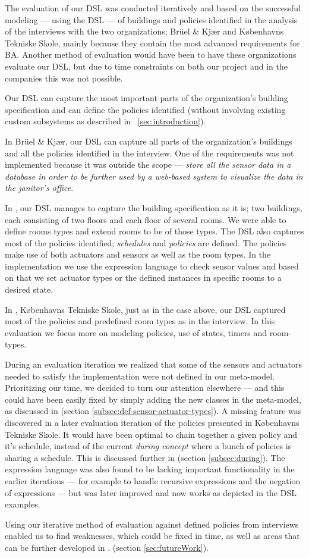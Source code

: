 The evaluation of our DSL was conducted iteratively and based on the successful modeling --- using the DSL --- of buildings and policies identified in the analysis of the interviews with the two organizations; Br\"{u}el \& Kj\ae r and K\o benhavns Tekniske Skole, mainly because they contain the most advanced requirements for BA. Another method of evaluation would have been to have these organizations evaluate our DSL, but due to time constraints on both our project and in the companies this was not possible. 

Our DSL can capture the most important parts of the organization's building specification and can define the policies identified (without involving existing custom subsystems as described in ~\ref{sec:introduction}). 

In Br\"{u}el \& Kj\ae r, our DSL can capture all parts of the organization's buildings and all the policies identified in the interview. One of the requirements was not implemented because it was outside the scope --- \textit{store all the sensor data in a database in order to be further used by a web-based system to visualize the data in the janitor's office}.

In , our DSL manages to capture the building specification as it is; two buildings, each consisting of two floors and each floor of several rooms. We were able to define rooms types and extend rooms to be of those types. The DSL also captures most of the policies identified; \textit{schedules} and \textit{policies} are defined. The policies make use of both actuators and sensors as well as the room types. In the implementation we use the expression language to check sensor values and based on that we set actuator types or the defined instances in specific rooms to a desired state.

In , K\o benhavns Tekniske Skole, just as in the case above, our DSL captured most of the policies and predefined room types as in the interview. In this evaluation we focus more on modeling policies, use of states, timers and room-types.

During an evaluation iteration we realized that some of the sensors and actuators needed to satisfy the implementation were not defined in our meta-model. Prioritizing our time, we decided to turn our attention elsewhere --- and this could have been easily fixed by simply adding the new classes in the meta-model, as discussed in  (section \ref{subsec:def-sensor-actuator-types}). A missing feature was discovered in a later evaluation iteration of the policies presented in K\o benhavns Tekniske Skole. It would have been optimal to chain together a given policy and it's schedule, instead of the current \textit{during concept} where a bunch of policies is sharing a schedule. This is discussed further in  (section \ref{subsec:during}). The expression language was also found to be lacking important functionality in the earlier iterations --- for example to handle recursive expressions and the negation of expressions --- but was later improved and now works as depicted in the DSL examples. 

Using our iterative method of evaluation against defined policies from interviews enabled us to find weaknesses, which could be fixed in time, as well as areas that can be further developed in . (section \ref{sec:futureWork}). 